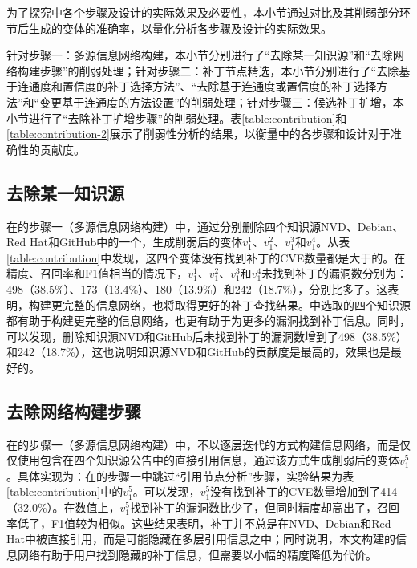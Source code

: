 为了探究\tool 中各个步骤及设计的实际效果及必要性，本小节通过对比\tool 及其削弱部分环节后生成的变体的准确率，以量化分析各步骤及设计的实际效果。

针对步骤一：多源信息网络构建，本小节分别进行了“去除某一知识源”和“去除网络构建步骤”的削弱处理；针对步骤二：补丁节点精选，本小节分别进行了“去除基于连通度和置信度的补丁选择方法”、“去除基于连通度或置信度的补丁选择方法”和“变更基于连通度的方法设置”的削弱处理；针对步骤三：候选补丁扩增，本小节进行了“去除补丁扩增步骤”的削弱处理。表\ref{table:contribution}和\ref{table:contribution-2}展示了削弱性分析的结果，以衡量\tool 中的各步骤和设计对于准确性的贡献度。

\subsection{去除某一知识源} 
在\tool 的步骤一（多源信息网络构建）中，通过分别删除四个知识源NVD、Debian、Red Hat和GitHub中的一个，生成削弱后的变体$v_1^1$、$v_1^2$、$v_1^3$和$v_1^4$。从表\ref{table:contribution}中发现，这四个变体没有找到补丁的CVE数量都是大于\tool 的。在精度、召回率和F1值相当的情况下，$v_1^1$、$v_1^2$、$v_1^3$和$v_1^4$未找到补丁的漏洞数分别为：498（38.5\%）、173（13.4\%）、180（13.9\%）和242（18.7\%），分别比\tool 多了。这表明，构建更完整的信息网络，也将取得更好的补丁查找结果。\tool 中选取的四个知识源都有助于构建更完整的信息网络，也更有助于为更多的漏洞找到补丁信息。同时，可以发现，删除知识源NVD和GitHub后未找到补丁的漏洞数增到了498（38.5\%）和242（18.7\%），这也说明知识源NVD和GitHub的贡献度是最高的，效果也是最好的。

\subsection{去除网络构建步骤}
在\tool 的步骤一（多源信息网络构建）中，不以逐层迭代的方式构建信息网络，而是仅仅使用包含在四个知识源公告中的直接引用信息，通过该方式生成削弱后的变体$v_1^5$。具体实现为：在\tool 的步骤一中跳过“引用节点分析”步骤，实验结果为表\ref{table:contribution}中的$v_1^5$。可以发现，$v_1^5$没有找到补丁的CVE数量增加到了414（32.0\%）。在数值上，$v_1^5$找到补丁的漏洞数比\tool 少了，但同时精度却高出了，召回率低了，F1值较为相似。这些结果表明，补丁并不总是在NVD、Debian和Red Hat中被直接引用，而是可能隐藏在多层引用信息之中；同时说明，本文构建的信息网络有助于用户找到隐藏的补丁信息，但需要以小幅的精度降低为代价。


